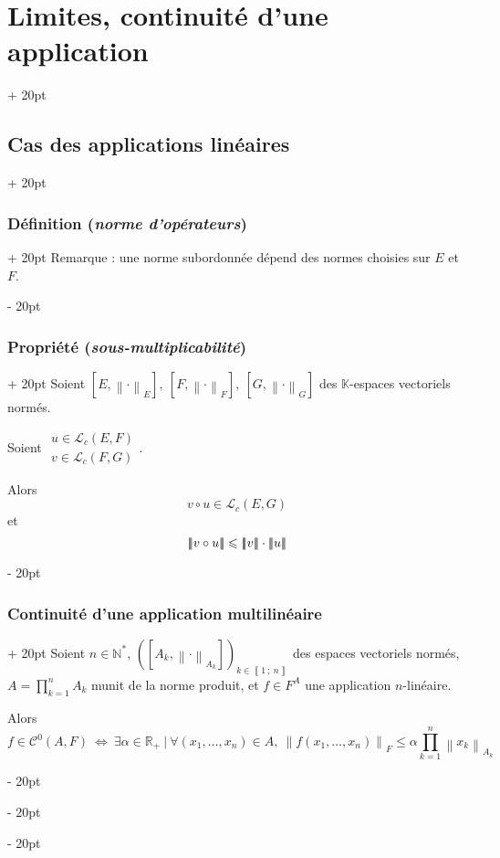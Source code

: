 \documentclass[a4paper, 12pt, twoside]{article}
\newcommand{\N}{\mathbb{N}} %
\newcommand{\R}{\mathbb{R}} %
\newcommand{\K}{\mathbb K}
\newcommand{\nset}[2]{\left\llbracket #1\ ;\ #2 \right\rrbracket}
\newcommand{\lr}[1]{\left( #1 \right)}
\newcommand{\lrb}[1]{\left[ #1 \right]}
\newcommand{\norm}[1]{\left\lVert #1 \right\rVert}
\newcommand{\nnorm}[2][-2pt]{{\left\lvert \kern#1 \left\lvert \kern#1 \left\lvert #2 \right\rvert \kern#1 \right\rvert \kern#1 \right\rvert}}
\newcommand{\ssi}{\ \Leftrightarrow \ }
\renewcommand{\le}{\leqslant}
\newcommand{\ind}[1][20pt]{\advance\leftskip + #1}
\newcommand{\deind}[1][20pt]{\advance\leftskip - #1}
\newenvironment{indt}[2][20pt]{#2 \par \ind[#1]}{\par \deind} %
\begin{document}
\begin{indt}{\section{Limites, continuité d'une application}}
\begin{indt}{\subsection{Cas des applications linéaires}}
\begin{indt}{\subsubsection{Définition (\textit{norme d'opérateurs})}}
                Remarque : une norme subordonnée dépend des normes choisies sur $E$ et $F$.
            \end{indt}

            \vspace{12pt}
            
            \begin{indt}{\subsubsection{Propriété (\textit{sous-multiplicabilité})}}
                Soient $[E, \norm \cdot _E],\ [F, \norm \cdot _F],\ [G, \norm \cdot _G]$ des $\K$-espaces vectoriels normés.

                Soient
                $
                    \begin{array}{|l}
                        u \in \mathcal L_c(E, F)
                        \\
                        v \in \mathcal L_c(F, G)
                    \end{array}
                $.

                \vspace{6pt}
                
                Alors
                \[
                    v \circ u \in \mathcal L_c(E, G)
                \]
                et
                \[
                    \nnorm{v \circ u} \le \nnorm{v} \cdot \nnorm u
                \]
            \end{indt}
            
            \vspace{12pt}
            
            \begin{indt}{\subsubsection{Continuité d'une application multilinéaire}}
                Soient $n \in \N^*$, $\lr{\lrb{A_k, \norm \cdot _{A_k}}}_{k \in \nset 1 n}$ des espaces vectoriels normés, $\displaystyle A = \prod_{k = 1}^n A_k$ munit de la norme produit, et $f \in F^A$ une application $n$-linéaire.

                Alors
                \[
                    f \in \mathcal C^0(A, F)
                    \ssi
                    \exists \alpha \in \R_+\ |\
                    \forall (x_1, \ldots, x_n) \in A,\
                    \norm{f(x_1, \ldots, x_n)}_F \le \alpha \prod_{k = 1}^n \norm{x_k}_{A_k}
                \]
            \end{indt}
        \end{indt}
    \end{indt}
\end{document}
